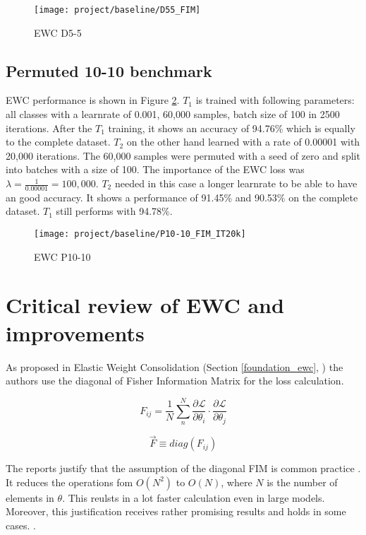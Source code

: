\begin{figure}[H]
    \centering
    \texttt{[image: project/baseline/D55\_FIM]}
    \caption{EWC D5-5}
    \label{fig:ewc_d5-5}
\end{figure}

\subsection*{Permuted 10-10 benchmark}

EWC performance is shown in Figure \ref{fig:ewc_p10-10}.
$T_1$ is trained with following parameters:
all classes with a
learnrate of 0.001,
60,000 samples,
batch size of 100 in
2500 iterations.
After the $T_1$ training, it shows an accuracy of 94.76\% which is equally to the complete dataset.
\newline
$T_2$ on the other hand learned with a rate of 0.00001 with 20,000 iterations.
The 60,000 samples were permuted with a seed of zero and split into batches with a size of 100.
The importance of the EWC loss was $\lambda = \frac{1}{0.00001} = 100,000$.
$T_2$ needed in this case a longer learnrate to be able to have an good accuracy.
It shows a performance of 91.45\% and 90.53\% on the complete dataset.
$T_1$ still performs with 94.78\%.

\begin{figure}[H]
    \centering
    \texttt{[image: project/baseline/P10-10\_FIM\_IT20k]}
    \caption{EWC P10-10}
    \label{fig:ewc_p10-10}
\end{figure}

\section{Critical review of EWC and improvements}
\label{project_review_improvements}

As proposed in Elastic Weight Consolidation (Section \ref{foundation_ewc}, \cite{elastic-weight-consolidation}) the authors use the diagonal of Fisher Information Matrix for the loss calculation.

$$F_{ij} = \frac{1}{N} \sum_{n}^{N} \frac{\partial \mathcal{L}}{\partial \theta_{i}} \cdot \frac{\partial \mathcal{L}}{\partial \theta_{j}}$$

$$\vec{F} \equiv diag \left(F_{ij}\right)$$

The reports \cite{better-weight-consolidation,elastic-weight-consolidation} justify that the assumption of the diagonal FIM is common practice \cite{elastic-weight-consolidation,better-weight-consolidation,incremental-moment-matching}.
It reduces the operations fom $O(N^2)$ to $O(N)$, where $N$ is the number of elements in $\theta$.
This reulsts in a lot faster calculation even in large models.
\cite{elastic-weight-consolidation,better-weight-consolidation}
Moreover, this justification receives rather promising results and holds in some cases.
\cite{elastic-weight-consolidation,incremental-moment-matching}.

